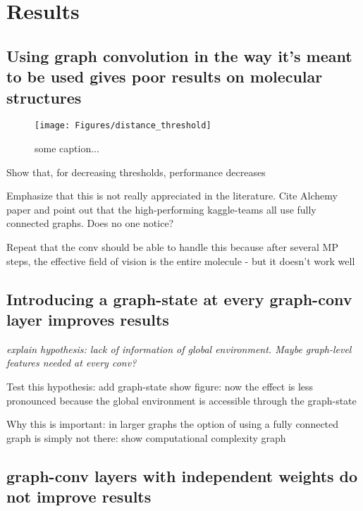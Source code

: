 \chapter{Results}
\label{chapter:Results}

\section{Using graph convolution in the way it's meant to be used gives poor results on molecular structures}


\begin{figure}[H]
	\texttt{[image: Figures/distance\_threshold]}
	\caption{some caption...}
	\label{fig:distance_threshold}
\end{figure}

{\itshape

Show that, for decreasing thresholds, performance decreases

Emphasize that this is not really appreciated in the literature.
Cite Alchemy paper and point out that the high-performing kaggle-teams all use fully connected graphs.
Does no one notice?

Repeat that the conv should be able to handle this because after several MP steps, the effective field of vision is the entire molecule - but it doesn't work well


}

\section{Introducing a graph-state at every graph-conv layer improves results}



{\itshape
explain hypothesis:
lack of information of global environment. Maybe graph-level features needed at every conv?

Test this hypothesis:
add graph-state
show figure: now the effect is less pronounced because the global environment is accessible through the graph-state

Why this is important:
in larger graphs the option of using a fully connected graph is simply not there:
show computational complexity graph
}


\section{graph-conv layers with independent weights do not improve results}

